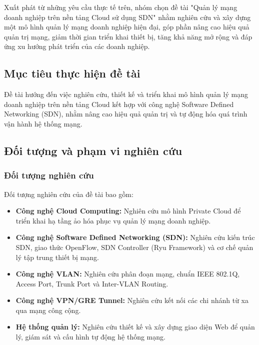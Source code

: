 Xuất phát từ những yêu cầu thực tế trên, nhóm chọn đề tài "Quản lý mạng doanh nghiệp trên nền tảng Cloud sử dụng SDN" nhằm nghiên cứu và xây dựng một mô hình quản lý mạng doanh nghiệp hiện đại, góp phần nâng cao hiệu quả quản trị mạng, giảm thời gian triển khai thiết bị, tăng khả năng mở rộng và đáp ứng xu hướng phát triển của các doanh nghiệp.

\subsection{Mục tiêu thực hiện đề tài}
Đề tài hướng đến việc nghiên cứu, thiết kế và triển khai mô hình quản lý mạng doanh nghiệp trên nền tảng Cloud kết hợp với công nghệ Software Defined Networking (SDN), nhằm nâng cao hiệu quả quản trị và tự động hóa quá trình vận hành hệ thống mạng.

\subsection{Đối tượng và phạm vi nghiên cứu}

\subsubsection{Đối tượng nghiên cứu}
Đối tượng nghiên cứu của đề tài bao gồm:
\begin{itemize}
    \item \textbf{Công nghệ Cloud Computing:} Nghiên cứu mô hình Private Cloud để triển khai hạ tầng ảo hóa phục vụ quản lý mạng doanh nghiệp.
    \item \textbf{Công nghệ Software Defined Networking (SDN):} Nghiên cứu kiến trúc SDN, giao thức OpenFlow, SDN Controller (Ryu Framework) và cơ chế quản lý tập trung thiết bị mạng.
    \item \textbf{Công nghệ VLAN:} Nghiên cứu phân đoạn mạng, chuẩn IEEE 802.1Q, Access Port, Trunk Port và Inter-VLAN Routing.
    \item \textbf{Công nghệ VPN/GRE Tunnel:} Nghiên cứu kết nối các chi nhánh từ xa qua mạng công cộng.
    \item \textbf{Hệ thống quản lý:} Nghiên cứu thiết kế và xây dựng giao diện Web để quản lý, giám sát và cấu hình tự động hệ thống mạng.
\end{itemize}

